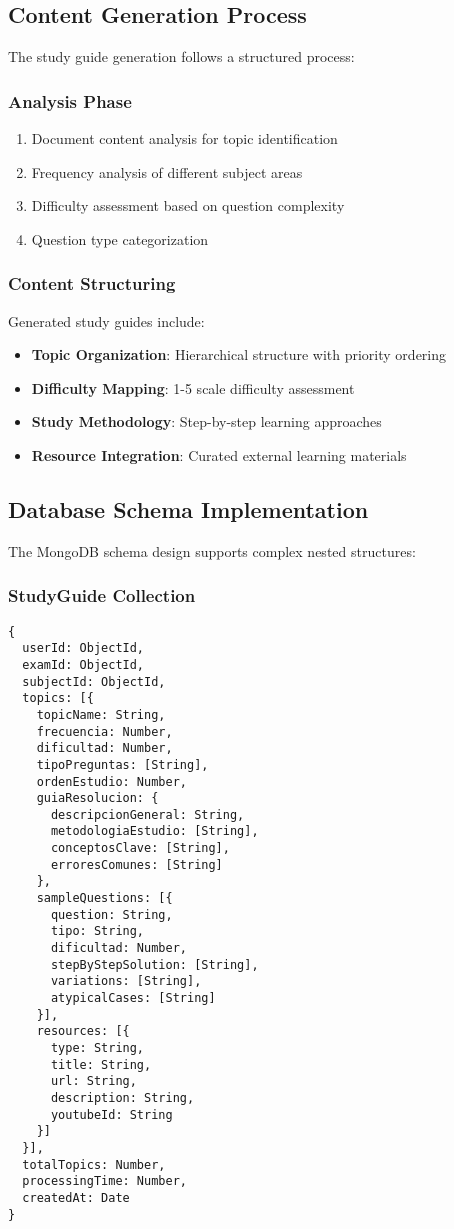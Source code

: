 \documentclass[conference]{IEEEtran}
\begin{document}
\subsection{Content Generation Process}

The study guide generation follows a structured process:

\subsubsection{Analysis Phase}
\begin{enumerate}
\item Document content analysis for topic identification
\item Frequency analysis of different subject areas
\item Difficulty assessment based on question complexity
\item Question type categorization
\end{enumerate}

\subsubsection{Content Structuring}
Generated study guides include:
\begin{itemize}
\item \textbf{Topic Organization}: Hierarchical structure with priority ordering
\item \textbf{Difficulty Mapping}: 1-5 scale difficulty assessment
\item \textbf{Study Methodology}: Step-by-step learning approaches
\item \textbf{Resource Integration}: Curated external learning materials
\end{itemize}

\subsection{Database Schema Implementation}

The MongoDB schema design supports complex nested structures:

\subsubsection{StudyGuide Collection}
\begin{verbatim}
{
  userId: ObjectId,
  examId: ObjectId,
  subjectId: ObjectId,
  topics: [{
    topicName: String,
    frecuencia: Number,
    dificultad: Number,
    tipoPreguntas: [String],
    ordenEstudio: Number,
    guiaResolucion: {
      descripcionGeneral: String,
      metodologiaEstudio: [String],
      conceptosClave: [String],
      erroresComunes: [String]
    },
    sampleQuestions: [{
      question: String,
      tipo: String,
      dificultad: Number,
      stepByStepSolution: [String],
      variations: [String],
      atypicalCases: [String]
    }],
    resources: [{
      type: String,
      title: String,
      url: String,
      description: String,
      youtubeId: String
    }]
  }],
  totalTopics: Number,
  processingTime: Number,
  createdAt: Date
}
\end{verbatim}
\end{document}
